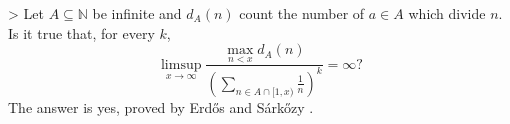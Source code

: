 > Let $A\subseteq\mathbb{N}$ be infinite and $d_A(n)$ count the number of $a\in A$ which divide $n$. Is it true that, for every $k$,\[\limsup_{x\to \infty}  \frac{\max_{n<x}d_A(n)}{\left(\sum_{n\in A\cap[1,x)}\frac{1}{n}\right)^k}=\infty?\] The answer is yes, proved by Erd\H{o}s and S\'{a}rk\H{o}zy \cite{ErSa80}.